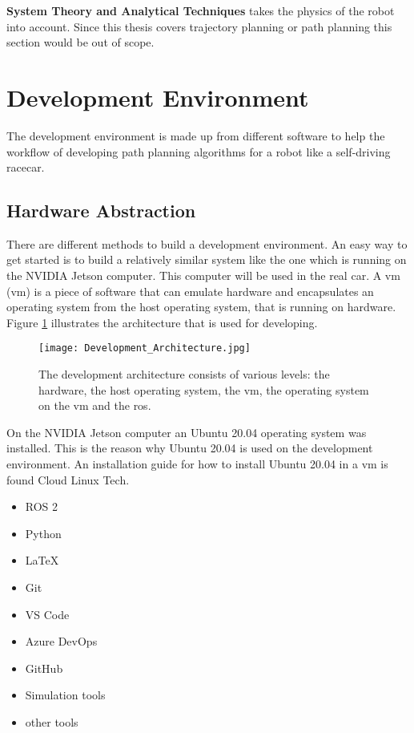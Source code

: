 \textbf{System Theory and Analytical Techniques} takes the physics of the robot into account. Since this thesis covers trajectory planning or path planning this section would be out of scope. \cite{planning_algorithms_steven_m_lavalle}

\section{Development Environment} \label{sec:Development Environment}

The development environment is made up from different software to help the workflow of developing path planning algorithms for a robot like a self-driving racecar.

\subsection{Hardware Abstraction} \label{sec:Hardware Abstraction}

There are different methods to build a development environment. An easy way to get started is to build a relatively similar system like the one which is running on the NVIDIA Jetson computer. This computer will be used in the real car. A \acrlong{vm} (\acrshort{vm}) is a piece of software that can emulate hardware and encapsulates an operating system from the host operating system, that is running on hardware. Figure \ref{fig:Development Architecture} illustrates the architecture that is used for developing.

\begin{figure}[H]
    \centering
    \texttt{[image: Development\_Architecture.jpg]}
    \caption{The development architecture consists of various levels: the hardware, the host operating system, the \acrlong{vm}, the operating system on the \acrshort{vm} and the \acrlong{ros}.}
    \label{fig:Development Architecture}
\end{figure}

On the NVIDIA Jetson computer an Ubuntu 20.04 operating system was installed. This is the reason why Ubuntu 20.04 is used on the development environment. An installation guide for how to install Ubuntu 20.04 in a \acrlong{vm} is found Cloud Linux Tech. \cite{cloudlinuxtech_install_ubuntu_2004}

\begin{itemize}
    \item ROS 2
    \item Python
    \item LaTeX
    \item Git
    \item VS Code
    \item Azure DevOps
    \item GitHub
    \item Simulation tools
    \item other tools
\end{itemize}

